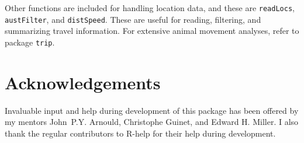\documentclass[12pt, letterpaper]{scrartcl}
\newcommand{\Rfunction}[1]{{\texttt{#1}}}
\newcommand{\Rpackage}[1]{{\texttt{#1}}}
\begin{document}
Other functions are included for handling location data, and these are
\Rfunction{readLocs}, \Rfunction{austFilter}, and \Rfunction{distSpeed}.
These are useful for reading, filtering, and summarizing travel
information.  For extensive animal movement analyses, refer to package
\Rpackage{trip}.


\section{Acknowledgements}
\label{sec:acknowledgements}

Invaluable input and help during development of this package has been
offered by my mentors John~P.Y. Arnould, Christophe Guinet, and Edward
H. Miller.  I also thank the regular contributors to R-help for their help
during development.






\newpage{}

\end{document}
